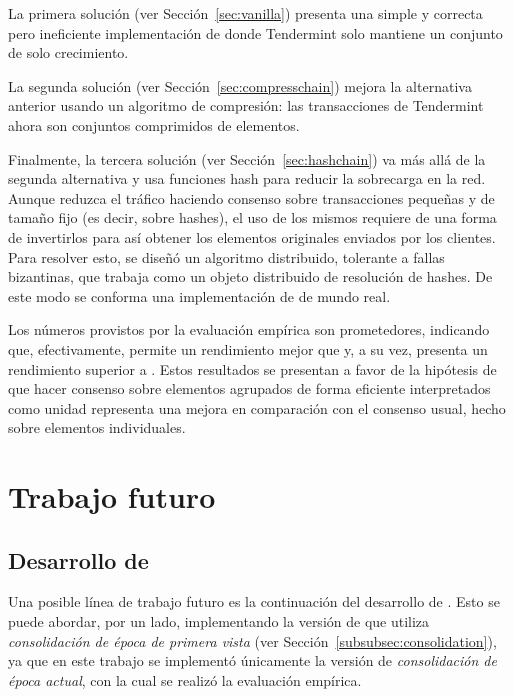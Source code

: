 %
La primera solución (ver Sección~\ref{sec:vanilla}) presenta una simple y
correcta pero ineficiente implementación de \setchain donde Tendermint solo mantiene
un conjunto de solo crecimiento.

%
La segunda solución (ver Sección~\ref{sec:compresschain}) mejora la alternativa anterior
usando un algoritmo de compresión: las transacciones de Tendermint ahora son conjuntos
comprimidos de elementos.

%
Finalmente, la tercera solución (ver Sección~\ref{sec:hashchain}) va más allá de la
segunda alternativa y usa funciones hash para reducir la sobrecarga en la red.
Aunque reduzca el tráfico haciendo consenso sobre transacciones pequeñas
y de tamaño fijo (es decir, sobre hashes), el uso de los mismos requiere de una forma de
invertirlos para así obtener los elementos originales enviados por los clientes.
Para resolver esto, se diseñó
un algoritmo distribuido, tolerante a fallas bizantinas, que trabaja como un objeto
distribuido de resolución de hashes.
De este modo se conforma una implementación de \setchain de mundo real.

%
%


Los números provistos por la evaluación empírica son prometedores, indicando que,
efectivamente, \compresschain permite un rendimiento mejor que \vanilla y, a su vez,
\hashchain presenta un rendimiento superior a \compresschain.
Estos resultados se presentan a favor de la hipótesis de que hacer consenso sobre
elementos agrupados de forma eficiente interpretados como unidad representa una
mejora en comparación con el consenso usual, hecho sobre elementos individuales. 

\section{Trabajo futuro}

\subsection{Desarrollo de \hashchain}
Una posible línea de trabajo futuro es la continuación del desarrollo
de \hashchain.
Esto se puede abordar, por un lado, implementando la versión de \hashchain que utiliza
\textit{consolidación de época de primera vista} (ver Sección~\ref{subsubsec:consolidation}),
ya que en este trabajo se implementó únicamente la versión
de \textit{consolidación de época actual}, con la cual se realizó la evaluación
empírica.

